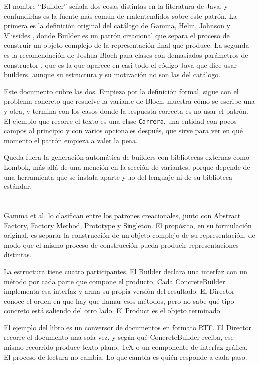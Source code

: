 \documentclass[10pt,a4paper]{article}
\begin{document}
El nombre \enquote{Builder} señala dos cosas distintas en la literatura de Java, y confundirlas es la fuente más común de malentendidos sobre este patrón. La primera es la definición original del catálogo de Gamma, Helm, Johnson y Vlissides \cite{gamma1994}, donde Builder es un patrón creacional que separa el proceso de construir un objeto complejo de la representación final que produce. La segunda es la recomendación de Joshua Bloch para clases con demasiados parámetros de constructor \cite{bloch2018}, que es la que aparece en casi todo el código Java que dice usar builders, aunque su estructura y su motivación no son las del catálogo.

Este documento cubre las dos. Empieza por la definición formal, sigue con el problema concreto que resuelve la variante de Bloch, muestra cómo se escribe una y otra, y termina con los casos donde la respuesta correcta es no usar el patrón. El ejemplo que recorre el texto es una clase \texttt{Carrera}, una entidad con pocos campos al principio y con varios opcionales después, que sirve para ver en qué momento el patrón empieza a valer la pena.

Queda fuera la generación automática de builders con bibliotecas externas como Lombok, más allá de una mención en la sección de variantes, porque depende de una herramienta que se instala aparte y no del lenguaje ni de su biblioteca estándar.

\section{\color{colorIPN}{Qué es el patrón Builder}}

Gamma et al. lo clasifican entre los patrones creacionales, junto con Abstract Factory, Factory Method, Prototype y Singleton. El propósito, en su formulación original, es separar la construcción de un objeto complejo de su representación, de modo que el mismo proceso de construcción pueda producir representaciones distintas.

La estructura tiene cuatro participantes. El Builder declara una interfaz con un método por cada parte que compone el producto. Cada ConcreteBuilder implementa esa interfaz y arma su propia versión del resultado. El Director conoce el orden en que hay que llamar esos métodos, pero no sabe qué tipo concreto está saliendo del otro lado. El Product es el objeto terminado.

El ejemplo del libro es un conversor de documentos en formato RTF. El Director recorre el documento una sola vez, y según qué ConcreteBuilder reciba, ese mismo recorrido produce texto plano, TeX o un componente de interfaz gráfica. El proceso de lectura no cambia. Lo que cambia es quién responde a cada paso.
\end{document}
